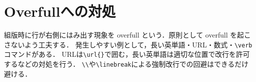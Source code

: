\begin{lstlisting}[language={[LaTeX]TeX}, numbers=none, frame=single]
 % 全ページ挿入
\end{lstlisting}

\section{Overfullへの対処}
\label{sec:overfull}
組版時に行が右側にはみ出す現象を overfull という．原則として overfull を起こさないよう工夫する．
発生しやすい例として，長い英単語・URL・数式・\verb|\verb|コマンドがある．
URLは\verb|\url{}|で囲む，長い英単語は適切な位置で改行を許可するなどの対処を行う．
\verb|\\|や\verb|\linebreak|による強制改行での回避はできるだけ避ける．
